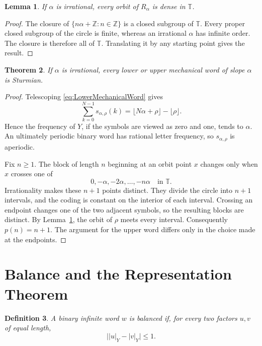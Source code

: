 \documentclass{book}
\newtheorem{definition}{Definition}[section]
\newtheorem{lemma}[definition]{Lemma}
\newtheorem{theorem}[definition]{Theorem}
\begin{document}
\begin{lemma}\label{lemma:IrrationalRotationDense}
  If \(\alpha\) is irrational, every orbit of \(R_\alpha\) is dense in
  \(\mathbb T\).
\end{lemma}
\begin{proof}
  The closure of \(\{n\alpha+\mathbb Z:n\in\mathbb Z\}\) is a closed
  subgroup of \(\mathbb T\).  Every proper closed subgroup of the circle is
  finite, whereas an irrational \(\alpha\) has infinite order.  The closure
  is therefore all of \(\mathbb T\).  Translating it by any starting point
  gives the result.
\end{proof}

\begin{theorem}\label{theorem:IrrationalMechanicalSturmian}
  If \(\alpha\) is irrational, every lower or upper mechanical word of
  slope \(\alpha\) is Sturmian.
\end{theorem}
\begin{proof}
  Telescoping \eqref{eq:LowerMechanicalWord} gives
  \[
    \sum_{k=0}^{N-1}s_{\alpha,\rho}(k)
    =\lfloor N\alpha+\rho\rfloor-\lfloor\rho\rfloor.
  \]
  Hence the frequency of \(Y\), if the symbols are viewed as zero and one,
  tends to \(\alpha\).  An ultimately periodic binary word has rational
  letter frequency, so \(s_{\alpha,\rho}\) is aperiodic.

  Fix \(n\geq1\).  The block of length \(n\) beginning at an orbit point
  \(x\) changes only when \(x\) crosses one of
  \[
    0,-\alpha,-2\alpha,\ldots,-n\alpha
    \quad\text{in }\mathbb T.
  \]
  Irrationality makes these \(n+1\) points distinct.  They divide the circle
  into \(n+1\) intervals, and the coding is constant on the interior of
  each interval.  Crossing an endpoint changes one of the two adjacent
  symbols, so the resulting blocks are distinct.  By
  Lemma~\ref{lemma:IrrationalRotationDense}, the orbit of \(\rho\) meets
  every interval.  Consequently \(p(n)=n+1\).  The argument for the upper
  word differs only in the choice made at the endpoints.
\end{proof}

\section{Balance and the Representation Theorem}

\begin{definition}
  A binary infinite word \(w\) is \textnormal{balanced} if, for every two
  factors \(u,v\) of equal length,
  \[
    \bigl||u|_Y-|v|_Y\bigr|\leq1.
  \]
\end{definition}
\end{document}
